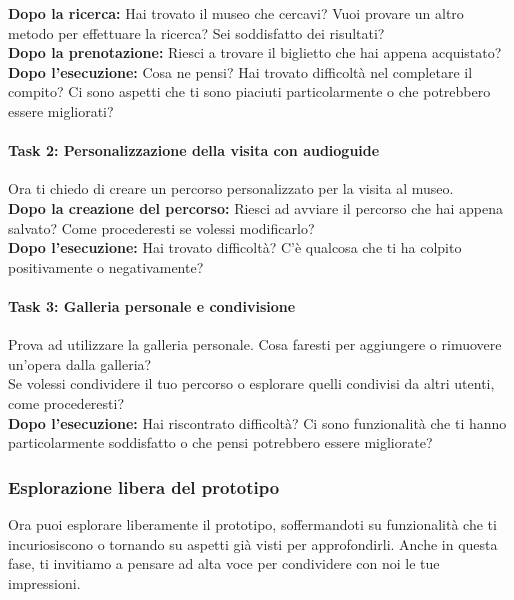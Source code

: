 \documentclass{article}
\begin{document}
\textbf{Dopo la ricerca:} 
Hai trovato il museo che cercavi? Vuoi provare un altro metodo per effettuare la ricerca? Sei soddisfatto dei risultati?\\

\textbf{Dopo la prenotazione:} 
Riesci a trovare il biglietto che hai appena acquistato?\\

\textbf{Dopo l'esecuzione:} 
Cosa ne pensi? Hai trovato difficoltà nel completare il compito? Ci sono aspetti che ti sono piaciuti particolarmente o che potrebbero essere migliorati?

\paragraph*{Task 2: Personalizzazione della visita con audioguide}
Ora ti chiedo di creare un percorso personalizzato per la visita al museo.\\

\textbf{Dopo la creazione del percorso:} 
Riesci ad avviare il percorso che hai appena salvato? Come procederesti se volessi modificarlo?\\

\textbf{Dopo l'esecuzione:} 
Hai trovato difficoltà? C’è qualcosa che ti ha colpito positivamente o negativamente?

\paragraph*{Task 3: Galleria personale e condivisione}
Prova ad utilizzare la galleria personale. Cosa faresti per aggiungere o rimuovere un’opera dalla galleria?\\

Se volessi condividere il tuo percorso o esplorare quelli condivisi da altri utenti, come procederesti?\\

\textbf{Dopo l'esecuzione:} 
Hai riscontrato difficoltà? Ci sono funzionalità che ti hanno particolarmente soddisfatto o che pensi potrebbero essere migliorate?

\subsubsection{Esplorazione libera del prototipo}
Ora puoi esplorare liberamente il prototipo, soffermandoti su funzionalità che ti incuriosiscono o tornando su aspetti già visti per approfondirli. Anche in questa fase, ti invitiamo a pensare ad alta voce per condividere con noi le tue impressioni.
\end{document}
